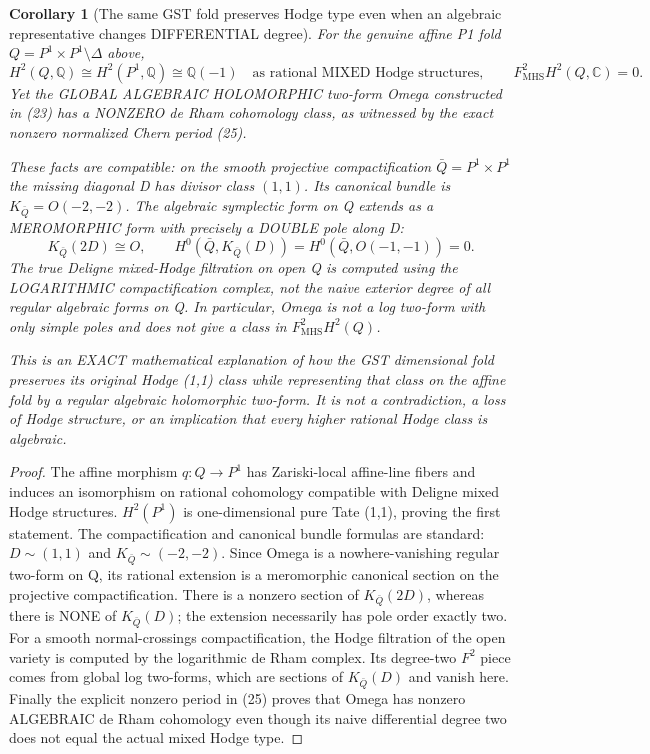\documentclass[11pt]{article}
\newtheorem{corollary}[theorem]{Corollary}
\begin{document}
\begin{corollary}[The same GST fold preserves Hodge type even when an algebraic representative changes DIFFERENTIAL degree]
For the genuine affine P1 fold
$Q=P^1\times P^1\setminus\Delta$ above,
\[
 \boxed{
 H^2(Q,\mathbb Q)
    \cong H^2(P^1,\mathbb Q)
    \cong\mathbb Q(-1)
 \quad\text{as rational MIXED Hodge structures},
 \qquad F^2_{\mathrm{MHS}}H^2(Q,\mathbb C)=0.
 }                                                     \tag{26}
\]
Yet the GLOBAL ALGEBRAIC HOLOMORPHIC
two-form Omega constructed in (23)
has a NONZERO de Rham cohomology class,
as witnessed by the exact
nonzero normalized Chern period (25).

These facts are compatible:
on the smooth projective compactification
$\bar Q=P^1\times P^1$
the missing diagonal D has
divisor class $(1,1)$.
Its canonical bundle is
$K_{\bar Q}=O(-2,-2)$.
The algebraic symplectic
form on Q extends as a
MEROMORPHIC form with
precisely a DOUBLE pole
along D:
\[
 \boxed{
 K_{\bar Q}(2D)\cong O,\qquad
 H^0(\bar Q,K_{\bar Q}(D))
      =H^0(\bar Q,O(-1,-1))=0.
 }                                                     \tag{27}
\]
The true Deligne mixed-Hodge filtration
on open Q is computed using
the LOGARITHMIC compactification
complex, not the naive exterior
degree of all regular algebraic
forms on Q. In particular,
Omega is not a log two-form
with only simple poles and
does not give a class in
$F^2_{\mathrm{MHS}}H^2(Q)$.

This is an EXACT mathematical
explanation of how the
GST dimensional fold
preserves its original
Hodge (1,1) class while
representing that class
on the affine fold by
a regular algebraic
holomorphic two-form.
It is not a contradiction,
a loss of Hodge structure,
or an implication that
every higher rational
Hodge class is algebraic.
\end{corollary}
\begin{proof}
The affine morphism
$q:Q\to P^1$ has Zariski-local
affine-line fibers and
induces an isomorphism
on rational cohomology
compatible with Deligne
mixed Hodge structures.
$H^2(P^1)$ is one-dimensional
pure Tate (1,1), proving
the first statement.
The compactification
and canonical bundle
formulas are standard:
$D\sim(1,1)$ and
$K_{\bar Q}\sim(-2,-2)$.
Since Omega is a
nowhere-vanishing regular
two-form on Q,
its rational extension
is a meromorphic
canonical section
on the projective
compactification.
There is a nonzero
section of
$K_{\bar Q}(2D)$,
whereas there is
NONE of $K_{\bar Q}(D)$;
the extension
necessarily has
pole order exactly two.
For a smooth normal-crossings
compactification, the
Hodge filtration of the
open variety is
computed by the
logarithmic de Rham
complex. Its degree-two
$F^2$ piece comes
from global log two-forms,
which are sections of
$K_{\bar Q}(D)$ and
vanish here.
Finally the explicit
nonzero period in (25)
proves that Omega has
nonzero ALGEBRAIC
de Rham cohomology
even though its
naive differential
degree two does
not equal the actual
mixed Hodge type.
\end{proof}
\end{document}
